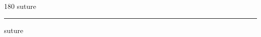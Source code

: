 
\begin{frame}
\begin{center}
\begin{turn}{180}
{\fontsize{2.5cm}{1em}\selectfont suture}
\end{turn}
\vspace{1em}\par  
\hrule
\vspace{1em}\par  
{\fontsize{2.5cm}{1em}\selectfont suture}
\end{center}
\end{frame}
